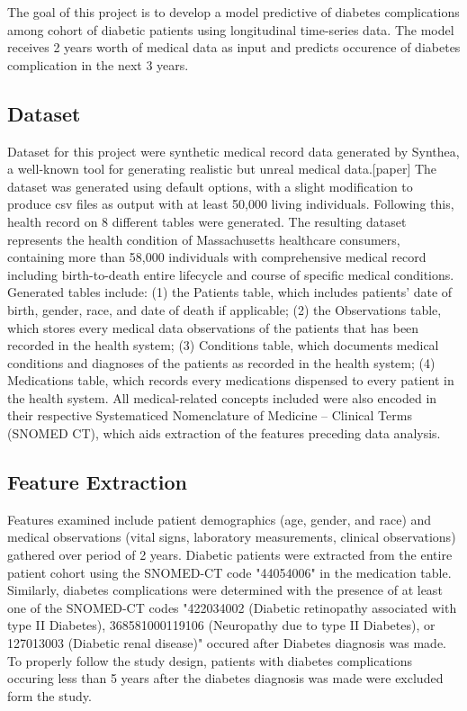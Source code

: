 \documentclass{article}
\begin{document}
The goal of this project is to develop a model predictive of diabetes complications among cohort of diabetic patients using longitudinal time-series data. The model receives 2 years worth of medical data as input and predicts occurence of diabetes complication in the next 3 years.

\subsection{Dataset}

Dataset for this project were synthetic medical record data generated by Synthea, a well-known tool for generating realistic but unreal medical data.[paper] The dataset was generated using default options, with a slight modification to produce csv files as output with at least 50,000 living individuals. Following this, health record on 8 different tables were generated. The resulting dataset represents the health condition of Massachusetts healthcare consumers, containing more than 58,000 individuals with comprehensive medical record including birth-to-death entire lifecycle and course of specific medical conditions. Generated tables include: (1) the Patients table, which includes patients' date of birth, gender, race, and date of death if applicable; (2) the Observations table, which stores every medical data observations of the patients that has been recorded in the health system; (3) Conditions table, which documents medical conditions and diagnoses of the patients as recorded in the health system; (4) Medications table, which records every medications dispensed to every patient in the health system. All medical-related concepts included were also encoded in their respective Systematiced Nomenclature of Medicine -- Clinical Terms (SNOMED CT), which aids extraction of the features preceding data analysis.\cite{leesnomedct}

\subsection{Feature Extraction}

Features examined include patient demographics (age, gender, and race) and medical observations (vital signs, laboratory measurements, clinical observations) gathered over period of 2 years. Diabetic patients were extracted from the entire patient cohort using the SNOMED-CT code "44054006" in the medication table. Similarly, diabetes complications were determined with the presence of at least one of the SNOMED-CT codes "422034002 (Diabetic retinopathy associated with type II Diabetes), 368581000119106 (Neuropathy due to type II Diabetes), or 127013003 (Diabetic renal disease)" occured after Diabetes diagnosis was made. To properly follow the study design, patients with diabetes complications occuring less than 5 years after the diabetes diagnosis was made were excluded form the study.
\end{document}
